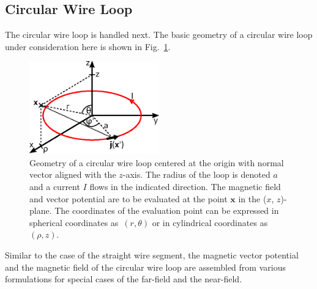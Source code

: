 \subsection{Circular Wire Loop}
\label{sec:methods_cwl}
The circular wire loop is handled next.
The basic geometry of a circular wire loop under consideration here is shown in Fig.~\ref{fig:circularWireLoop}.
\begin{figure}[htbp]
 \centering
 \includegraphics[width=0.5\textwidth]{img/circularWireLoop.eps}
 \caption{Geometry of a circular wire loop centered at the origin with normal vector aligned with the $z$-axis.
          The radius of the loop is denoted $a$ and a current $I$ flows in the indicated direction.
          The magnetic field and vector potential are to be evaluated at the point $\mathbf{x}$ in the ($x$, $z$)-plane.
          The coordinates of the evaluation point can be expressed in spherical coordinates as~$(r, \theta)$
          or in cylindrical coordinates as~$(\rho, z)$.}
 \label{fig:circularWireLoop}
\end{figure}
Similar to the case of the straight wire segment,
the magnetic vector potential and the magnetic field of the circular wire loop
are assembled from various formulations for special cases of the far-field and the near-field.

